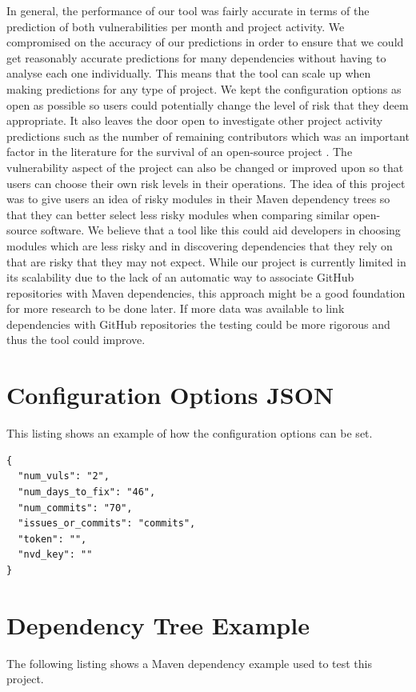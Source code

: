 \documentclass[conference]{IEEEtran}
\begin{document}
{In general, the performance of our tool was fairly accurate in terms of the prediction of both vulnerabilities per month and project activity. We compromised on the accuracy of our predictions in order to ensure that we could get reasonably accurate predictions for many dependencies without having to analyse each one individually. This means that the tool can scale up when making predictions for any type of project. We kept the configuration options as open as possible so users could potentially change the level of risk that they deem appropriate. It also leaves the door open to investigate other project activity predictions such as the number of remaining contributors which was an important factor in the literature for the survival of an open-source project \cite{l_bao_large_2021}. The vulnerability aspect of the project can also be changed or improved upon so that users can choose their own risk levels in their operations. The idea of this project was to give users an idea of risky modules in their Maven dependency trees so that they can better select less risky modules when comparing similar open-source software. We believe that a tool like this could aid developers in choosing modules which are less risky and in discovering dependencies that they rely on that are risky that they may not expect. While our project is currently limited in its scalability due to the lack of an automatic way to associate GitHub repositories with Maven dependencies, this approach might be a good foundation for more research to be done later. If more data was available to link dependencies with GitHub repositories the testing could be more rigorous and thus the tool could improve. 



\appendices

\section{Configuration Options JSON}
This listing shows an example of how the configuration options can be set. 

\begin{lstlisting}[caption=Configuration Options]
{
  "num_vuls": "2",
  "num_days_to_fix": "46",
  "num_commits": "70",
  "issues_or_commits": "commits",
  "token": "",
  "nvd_key": ""
}
\end{lstlisting}



\section{Dependency Tree Example}
The following listing shows a Maven dependency example used to test this project. 

}
\end{document}
